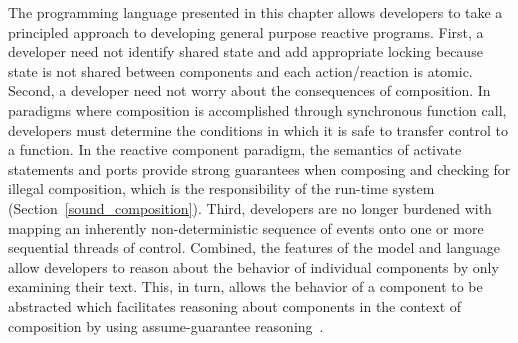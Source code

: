 The \rcgo{} programming language presented in this chapter allows developers to take a principled approach to developing general purpose reactive programs.
First, a developer need not identify shared state and add appropriate locking because state is not shared between components and each action/reaction is atomic.
Second, a developer need not worry about the consequences of composition.
In paradigms where composition is accomplished through synchronous function call, developers must determine the conditions in which it is safe to transfer control to a function.
In the reactive component paradigm, the semantics of activate statements and ports provide strong guarantees when composing and checking for illegal composition, which is the responsibility of the run-time system (Section~\ref{sound_composition}).
Third, developers are no longer burdened with mapping an inherently non-deterministic sequence of events onto one or more sequential threads of control.
Combined, the features of the model and language allow developers to reason about the behavior of individual components by only examining their text.
This, in turn, allows the behavior of a component to be abstracted which facilitates reasoning about components in the context of composition by using assume-guarantee reasoning~\cite{Jones:1983:TST:69575.69577}.
